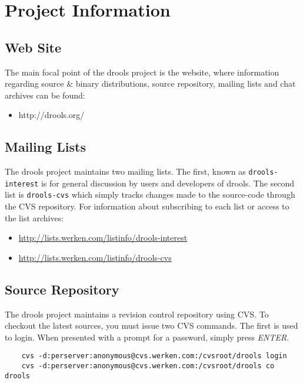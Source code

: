 \chapter{Project Information}


\section{Web Site}

The main focal point of the drools project is the website, where
information regarding source \& binary distributions, source
repository, mailing lists and chat archives can be found:

\begin{itemize}
    \item http://drools.org/
\end{itemize}

\section{Mailing Lists}

The drools project maintains two mailing lists.  The first, known as
\verb|drools-interest| is for general discussion by users and
developers of drools.  The second list is \verb|drools-cvs| which
simply tracks changes made to the source-code through the CVS
repository. For information about subscribing to each list or access 
to the list archives:

\begin{itemize}
    \item \url{http://lists.werken.com/listinfo/drools-interest}
    \item \url{http://lists.werken.com/listinfo/drools-cvs}
\end{itemize}

\section{Source Repository}

The drools project maintains a revision control repository using
CVS.  To checkout the latest sources, you must issue two CVS commands.
The first is used to login.  When presented with a prompt for a
password, simply press \emph{ENTER}.

\begin{verbatim}
    cvs -d:perserver:anonymous@cvs.werken.com:/cvsroot/drools login
    cvs -d:perserver:anonymous@cvs.werken.com:/cvsroot/drools co drools
\end{verbatim}

